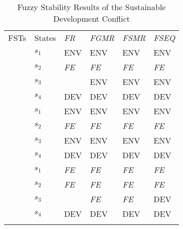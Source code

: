 \begin{table}[h!]
\centering \caption{Fuzzy Stability Results of the Sustainable Development Conflict}
\footnotesize
\setlength{\tabcolsep}{3pt}
\renewcommand{\arraystretch}{1.4}
\begin{tabular}{c|x{20mm}!{\vrule width 1.3pt} x{20mm}|x{20mm}|x{20mm}|x{20mm}}


FSTs & States & \emph{FR} & \emph{FGMR} & \emph{FSMR} & \emph{FSEQ} \\



 & $s_1$ &   ENV     &   ENV     &   ENV     &   ENV     \\
 & $s_2$ & \emph{FE} & \emph{FE} & \emph{FE} & \emph{FE} \\
 & $s_3$ &           &   ENV     &   ENV     &   ENV     \\
 & $s_4$ &   DEV     &   DEV     &   DEV     &   DEV     \\



 & $s_1$ &   ENV     &   ENV     &   ENV     &   ENV     \\
 & $s_2$ & \emph{FE} & \emph{FE} & \emph{FE} & \emph{FE} \\
 & $s_3$ &   ENV     &   ENV     &   ENV     &   ENV     \\
 & $s_4$ &   DEV     &   DEV     &   DEV     &   DEV     \\



 & $s_1$ & \emph{FE} & \emph{FE} & \emph{FE} & \emph{FE} \\
 & $s_2$ & \emph{FE} & \emph{FE} & \emph{FE} & \emph{FE} \\
 & $s_3$ &           & \emph{FE} & \emph{FE} &   DEV     \\
 & $s_4$ &   DEV     &   DEV     &   DEV     &   DEV     \\



\end{tabular}
\end{table}
